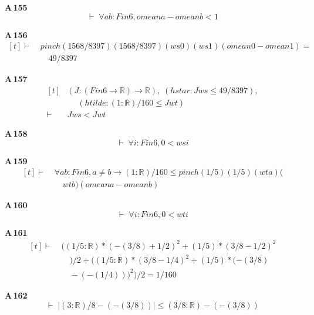 \noindent\textbf{A\,155}\quad{}
{\footnotesize\[ \vdash\; \forall \mathit{a} \mathit{b} : \mathit{Fin} 6, \mathit{omean} \mathit{a} - \mathit{omean} \mathit{b} < 1 \]}

\noindent\textbf{A\,156}\quad{}
{\footnotesize\[ \begin{aligned}[t]
\vdash\;&\mathit{pinch} (1568/8397) (1568/8397) (\mathit{ws} 0) (\mathit{ws} 1) (\mathit{omean} 0 - \mathit{omean} 1) =\\
&\quad 49/8397
\end{aligned} \]}

\noindent\textbf{A\,157}\quad{}
{\footnotesize\[ \begin{aligned}[t]
&(\mathit{J} : (\mathit{Fin} 6 \to \mathbb{R} ) \to \mathbb{R} ),\; (\mathit{hstar} : \mathit{J} \mathit{ws} \leq 49/8397),\\
&\quad \; (\mathit{htilde} : (1:\mathbb{R} )/160 \leq \mathit{J} \mathit{wt})\\
\vdash\;&\mathit{J} \mathit{ws} < \mathit{J} \mathit{wt}
\end{aligned} \]}

\noindent\textbf{A\,158}\quad{}
{\footnotesize\[ \vdash\; \forall \mathit{i} : \mathit{Fin} 6, 0 < \mathit{ws} \mathit{i} \]}

\noindent\textbf{A\,159}\quad{}
{\footnotesize\[ \begin{aligned}[t]
\vdash\;&\forall \mathit{a} \mathit{b} : \mathit{Fin} 6, \mathit{a} \neq \mathit{b} \to (1:\mathbb{R} )/160 \leq \mathit{pinch} (1/5) (1/5) (\mathit{wt} \mathit{a}) (\\
&\quad \mathit{wt} \mathit{b}) (\mathit{omean} \mathit{a} - \mathit{omean} \mathit{b})
\end{aligned} \]}

\noindent\textbf{A\,160}\quad{}
{\footnotesize\[ \vdash\; \forall \mathit{i} : \mathit{Fin} 6, 0 < \mathit{wt} \mathit{i} \]}

\noindent\textbf{A\,161}\quad{}
{\footnotesize\[ \begin{aligned}[t]
\vdash\;&((1/5 : \mathbb{R} ) * (-(3/8) + 1/2) ^{2} + (1/5) * (3/8 - 1/2) ^{2}\\
&\quad ) / 2 + ((1/5 : \mathbb{R} ) * (3/8 - 1/4) ^{2} + (1/5) * (-(3/8)\\
&\quad - (-(1/4))) ^{2}) / 2 = 1/160
\end{aligned} \]}

\noindent\textbf{A\,162}\quad{}
{\footnotesize\[ \vdash\; |(3:\mathbb{R} )/8 - (-(3/8))| \leq (3/8 : \mathbb{R} ) - (-(3/8)) \]}


